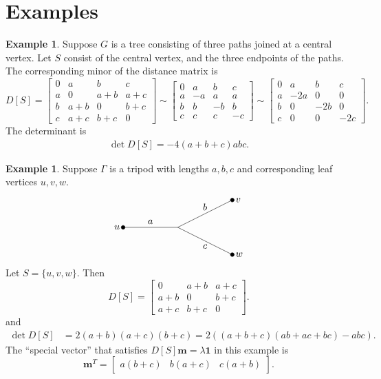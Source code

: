 \documentclass{amsart}
\theoremstyle{definition}
\newtheorem{eg}[thm]{Example}
\begin{document}
\section{Examples}

\begin{eg}
Suppose $G$ is a tree consisting of three paths joined at a central vertex.
Let $S$ consist of the central vertex, and the three endpoints of the paths. 
The corresponding minor of the distance matrix is
$$
D[S] = \begin{bmatrix}
0 & a & b & c \\
a & 0 & a + b & a + c \\
b & a + b & 0 & b + c \\
c & a + c & b + c & 0
\end{bmatrix}
\sim \begin{bmatrix}
0 & a & b & c \\
a & -a & a  & a \\
b & b & -b & b \\
c & c & c & -c
\end{bmatrix}
\sim \begin{bmatrix}
0 & a & b & c \\
a & -2a & 0 & 0 \\
b & 0 & -2b & 0 \\
c & 0 & 0 & -2c
\end{bmatrix}.
$$
The determinant is
\begin{align*}
\det D[S] 
= -4(a+b+c)abc.
\end{align*}
\end{eg}

\begin{eg}
Suppose $\Gamma$ is a tripod with lengths $a,b,c$ and corresponding leaf vertices $u,v,w$.
\[
\begin{tikzpicture}
	\draw (0,0) -- (-2,0);
	\draw (2,1) -- (0,0) -- (2,-1);
	\filldraw[black] (-2,0) circle (2pt);
	\filldraw[black] (2,1) circle (2pt);
	\filldraw[black] (2,-1) circle (2pt);

	\node[above] at (-1,0) {$a$};
	\node[above] at (1,0.5) {$b$};
	\node[below] at (1,-0.5) {$c$};

	\node[left] at (-2,0) {$u$};
	\node[right] at (2,1) {$v$};
	\node[right] at (2,-1) {$w$};
\end{tikzpicture}
\]
Let $S = \{u,v,w\}$.
Then 
$$
D[S] = \begin{bmatrix}
0 & a + b & a + c \\
a + b & 0 & b + c \\
a + c & b + c & 0
\end{bmatrix}.
$$
and
\begin{align*}
\det D[S] &= 2(a+b)(a+c)(b+c) 
= 2\left( (a+b+c)(ab + ac + bc) - abc \right).
\end{align*}
The ``special vector'' that satisfies $D[S] \mathbf{m} = \lambda \mathbf{1}$ in this example is 
$$\mathbf{m}^T = \begin{bmatrix} a(b + c) & b(a + c) & c(a + b) \end{bmatrix} .$$
\end{eg}
\end{document}

